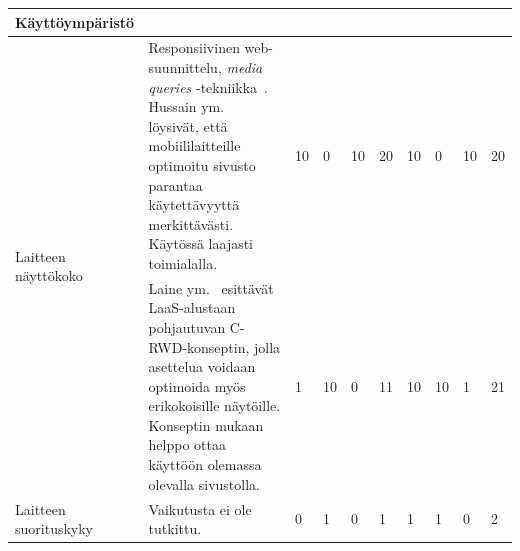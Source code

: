 \documentclass[finnish, 12pt, a4paper, elec, utf8, a-1b]{aaltothesis}
\begin{document}
{\begin{longtable}{p{2.5cm}|p{6cm}|p{0.5cm}p{0.5cm}p{0.5cm}|p{0.5cm}|p{0.5cm}p{0.5cm}p{0.5cm}|p{0.5cm}|}
    \midrule
    \textbf{Käyttöympäristö}                                                                                                                                                                                                                                                                                                                                                                                                                                                                                                                                                                                                                                                                                                                              \\
    \midrule
    \multirow[t]{2}{*}{Laitteen näyttökoko} & Responsiivinen web-suunnittelu, \textit{media queries} -tekniikka~\cite{Rivoal:12:MQ}. Hussain ym.~\cite{WOS:000218608600006} löysivät, että mobiililaitteille optimoitu sivusto parantaa käytettävyyttä merkittävästi. Käytössä laajasti toimialalla.                                                                                                                  & 10                                         & 0                                   & 10                                     & 20                           & 10                                              & 0                                         & 10                                        & 20                           \\\cline{2-10}
                                            & Laine ym.~\cite{laine2021responsive} esittävät LaaS-alustaan pohjautuvan C-RWD-konseptin, jolla asettelua voidaan optimoida myös erikokoisille näytöille. Konseptin mukaan helppo ottaa käyttöön olemassa olevalla sivustolla.                                                                                                                                          & 1                                          & 10                                  & 0                                      & 11                           & 10                                              & 10                                        & 1                                         & 21                           \\
    \midrule
    Laitteen suorituskyky                   & Vaikutusta ei ole tutkittu.                                                                                                                                                                                                                                                                                                                                             & 0                                          & 1                                   & 0                                      & 1                            & 1                                               & 1                                         & 0                                         & 2                            \\

\end{longtable}}
\end{document}
